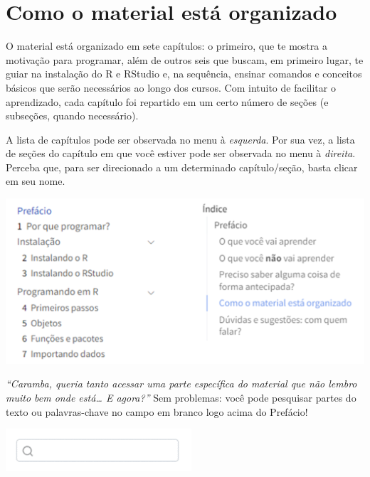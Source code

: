 \documentclass[
  letterpaper,
  DIV=11,
  numbers=noendperiod]{scrreprt}
\begin{document}
\section*{Como o material está
organizado}\label{como-o-material-estuxe1-organizado}


O material está organizado em sete capítulos: o primeiro, que te mostra
a motivação para programar, além de outros seis que buscam, em primeiro
lugar, te guiar na instalação do R e RStudio e, na sequência, ensinar
comandos e conceitos básicos que serão necessários ao longo dos cursos.
Com intuito de facilitar o aprendizado, cada capítulo foi repartido em
um certo número de seções (e subseções, quando necessário).

A lista de capítulos pode ser observada no menu à \emph{esquerda}. Por
sua vez, a lista de seções do capítulo em que você estiver pode ser
observada no menu à \emph{direita}. Perceba que, para ser direcionado a
um determinado capítulo/seção, basta clicar em seu nome.

\begin{center}
\includegraphics[width=5.63542in,height=\textheight]{images/clipboard-250739170.png}
\end{center}

\emph{``Caramba, queria tanto acessar uma parte específica do material
que não lembro muito bem onde está\ldots{} E agora?''} Sem problemas:
você pode pesquisar partes do texto ou palavras-chave no campo em branco
logo acima do Prefácio!

\begin{center}
\includegraphics[width=2.71875in,height=\textheight]{images/clipboard-2391069838.png}
\end{center}
\end{document}
